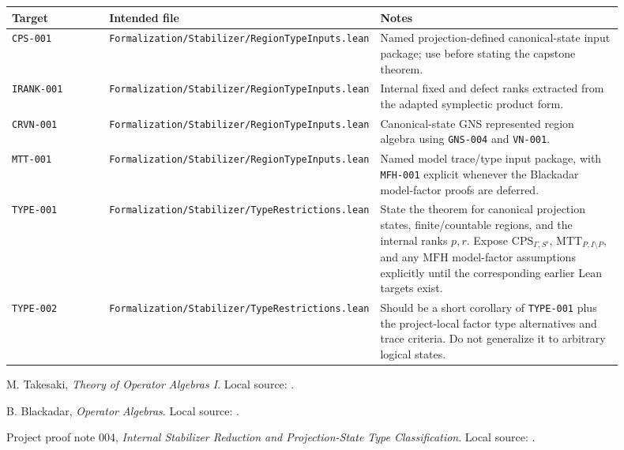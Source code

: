 \documentclass{article}
\begin{document}
\begin{longtable}{@{}p{0.16\linewidth}p{0.34\linewidth}p{0.40\linewidth}@{}}
\toprule
Target & Intended file & Notes \\
\midrule
\endhead
\texttt{CPS-001} &
\texttt{Formalization/Stabilizer/RegionTypeInputs.lean} &
Named projection-defined canonical-state input package; use before stating the
capstone theorem. \\
\texttt{IRANK-001} &
\texttt{Formalization/Stabilizer/RegionTypeInputs.lean} &
Internal fixed and defect ranks extracted from the adapted symplectic product
form. \\
\texttt{CRVN-001} &
\texttt{Formalization/Stabilizer/RegionTypeInputs.lean} &
Canonical-state GNS represented region algebra using \texttt{GNS-004} and
\texttt{VN-001}. \\
\texttt{MTT-001} &
\texttt{Formalization/Stabilizer/RegionTypeInputs.lean} &
Named model trace/type input package, with \texttt{MFH-001} explicit whenever
the Blackadar model-factor proofs are deferred. \\
\texttt{TYPE-001} &
\texttt{Formalization/Stabilizer/TypeRestrictions.lean} &
State the theorem for canonical projection states, finite/countable regions,
and the internal ranks \(p,r\).  Expose
\(\mathrm{CPS}_{\Gamma,S'}\), \(\mathrm{MTT}_{P,I\setminus P}\), and any
\(\mathrm{MFH}\) model-factor assumptions explicitly until the corresponding
earlier Lean targets exist. \\
\texttt{TYPE-002} &
\texttt{Formalization/Stabilizer/TypeRestrictions.lean} &
Should be a short corollary of \texttt{TYPE-001} plus the project-local factor
type alternatives and trace criteria.  Do not generalize it to arbitrary
logical states. \\
\bottomrule
\end{longtable}

\begin{thebibliography}{9}
M. Takesaki, \emph{Theory of Operator Algebras I}.  Local source:
.

B. Blackadar, \emph{Operator Algebras}.  Local source:
.

Project proof note 004,
\emph{Internal Stabilizer Reduction and Projection-State Type Classification}.
Local source:
.
\end{thebibliography}
\end{document}
